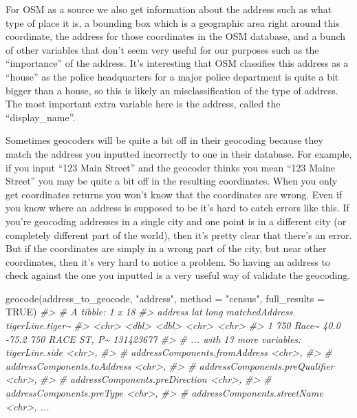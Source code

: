 \documentclass[
]{krantz}
\makeatletter
\newenvironment{Shaded}{\begin{snugshade}}{\end{snugshade}}
\newcommand{\AttributeTok}[1]{\textcolor[rgb]{0.61,0.61,0.61}{#1}}
\newcommand{\CommentTok}[1]{\textcolor[rgb]{0.37,0.37,0.37}{\textit{#1}}}
\newcommand{\ConstantTok}[1]{\textcolor[rgb]{0,0,0}{#1}}
\newcommand{\FunctionTok}[1]{\textcolor[rgb]{0,0,0}{#1}}
\newcommand{\NormalTok}[1]{#1}
\newcommand{\StringTok}[1]{\textcolor[rgb]{0.5,0.5,0.5}{#1}}
\newenvironment{kframe}{%
\medskip{}
\setlength{\fboxsep}{.8em}
 \def\at@end@of@kframe{}%
 \ifinner\ifhmode%
  \def\at@end@of@kframe{\end{minipage}}%
  \begin{minipage}{\columnwidth}%
 \fi\fi%
 \def\FrameCommand##1{\hskip\@totalleftmargin \hskip-\fboxsep
 \colorbox{shadecolor}{##1}\hskip-\fboxsep
     \hskip-\linewidth \hskip-\@totalleftmargin \hskip\columnwidth}%
 \MakeFramed {\advance\hsize-\width
   \@totalleftmargin\z@ \linewidth\hsize
   \@setminipage}}%
 {\par\unskip\endMakeFramed%
 \at@end@of@kframe}
\renewenvironment{Shaded}{\begin{kframe}}{\end{kframe}}
\makeatother
\begin{document}
For OSM as a source we also get information about the address such as what type of place it is, a bounding box which is a geographic area right around this coordinate, the address for those coordinates in the OSM database, and a bunch of other variables that don't seem very useful for our purposes such as the ``importance'' of the address. It's interesting that OSM classifies this address as a ``house'' as the police headquarters for a major police department is quite a bit bigger than a house, so this is likely an misclassification of the type of address. The most important extra variable here is the address, called the ``display\_name''.

Sometimes geocoders will be quite a bit off in their geocoding because they match the address you inputted incorrectly to one in their database. For example, if you input ``123 Main Street'' and the geocoder thinks you mean ``123 Maine Street'' you may be quite a bit off in the resulting coordinates. When you only get coordinates returns you won't know that the coordinates are wrong. Even if you know where an address is supposed to be it's hard to catch errors like this. If you're geocoding addresses in a single city and one point is in a different city (or completely different part of the world), then it's pretty clear that there's an error. But if the coordinates are simply in a wrong part of the city, but near other coordinates, then it's very hard to notice a problem. So having an address to check against the one you inputted is a very useful way of validate the geocoding.

\begin{Shaded}
\begin{Highlighting}[]
\FunctionTok{geocode}\NormalTok{(address\_to\_geocode, }\StringTok{"address"}\NormalTok{, }\AttributeTok{method =} \StringTok{"census"}\NormalTok{,}
  \AttributeTok{full\_results =} \ConstantTok{TRUE}\NormalTok{)}
\CommentTok{\#\textgreater{} \# A tibble: 1 x 18}
\CommentTok{\#\textgreater{}   address     lat  long matchedAddress  tigerLine.tiger\textasciitilde{}}
\CommentTok{\#\textgreater{}   \textless{}chr\textgreater{}     \textless{}dbl\textgreater{} \textless{}dbl\textgreater{} \textless{}chr\textgreater{}           \textless{}chr\textgreater{}           }
\CommentTok{\#\textgreater{} 1 750 Race\textasciitilde{}  40.0 {-}75.2 750 RACE ST, P\textasciitilde{} 131423677       }
\CommentTok{\#\textgreater{} \# ... with 13 more variables: tigerLine.side \textless{}chr\textgreater{},}
\CommentTok{\#\textgreater{} \#   addressComponents.fromAddress \textless{}chr\textgreater{},}
\CommentTok{\#\textgreater{} \#   addressComponents.toAddress \textless{}chr\textgreater{},}
\CommentTok{\#\textgreater{} \#   addressComponents.preQualifier \textless{}chr\textgreater{},}
\CommentTok{\#\textgreater{} \#   addressComponents.preDirection \textless{}chr\textgreater{},}
\CommentTok{\#\textgreater{} \#   addressComponents.preType \textless{}chr\textgreater{},}
\CommentTok{\#\textgreater{} \#   addressComponents.streetName \textless{}chr\textgreater{}, ...}
\end{Highlighting}
\end{Shaded}
\end{document}
